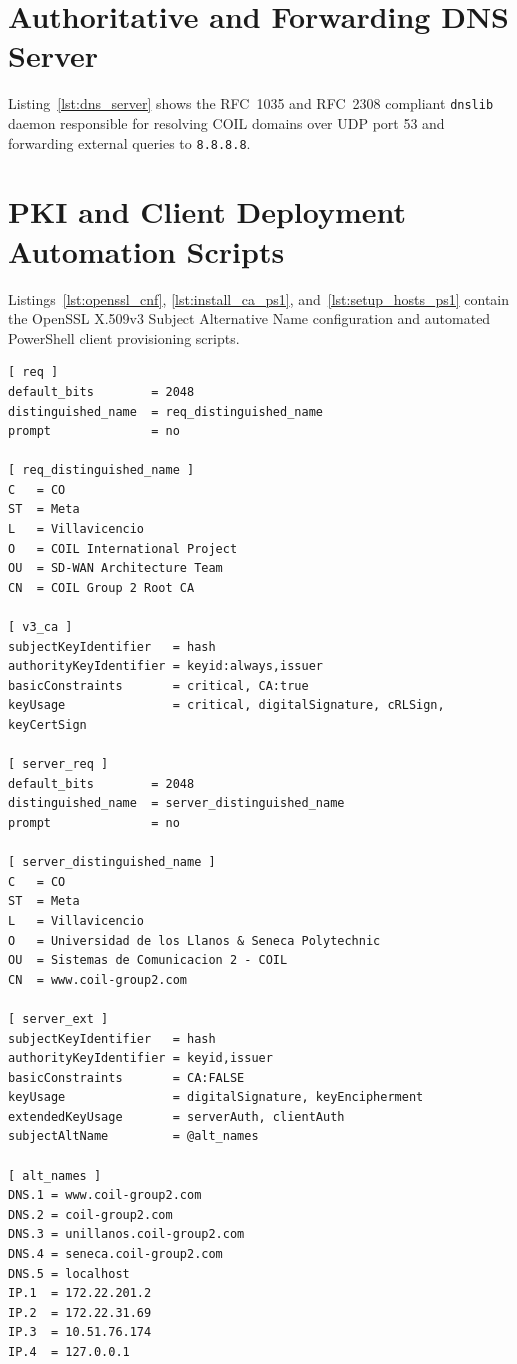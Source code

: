 \section{Authoritative and Forwarding DNS Server}
\label{app:dns_server}
Listing~\ref{lst:dns_server} shows the RFC~1035 and RFC~2308 compliant \texttt{dnslib} daemon responsible for resolving COIL domains over UDP port 53 and forwarding external queries to \texttt{8.8.8.8}.



\section{PKI and Client Deployment Automation Scripts}
\label{app:pki_scripts}
Listings~\ref{lst:openssl_cnf}, \ref{lst:install_ca_ps1}, and~\ref{lst:setup_hosts_ps1} contain the OpenSSL X.509v3 Subject Alternative Name configuration and automated PowerShell client provisioning scripts.

\begin{lstlisting}[caption={OpenSSL PKI and SAN extension policy (\texttt{modulo2/certificados/openssl.cnf}).},label={lst:openssl_cnf}]
[ req ]
default_bits        = 2048
distinguished_name  = req_distinguished_name
prompt              = no

[ req_distinguished_name ]
C   = CO
ST  = Meta
L   = Villavicencio
O   = COIL International Project
OU  = SD-WAN Architecture Team
CN  = COIL Group 2 Root CA

[ v3_ca ]
subjectKeyIdentifier   = hash
authorityKeyIdentifier = keyid:always,issuer
basicConstraints       = critical, CA:true
keyUsage               = critical, digitalSignature, cRLSign, keyCertSign

[ server_req ]
default_bits        = 2048
distinguished_name  = server_distinguished_name
prompt              = no

[ server_distinguished_name ]
C   = CO
ST  = Meta
L   = Villavicencio
O   = Universidad de los Llanos & Seneca Polytechnic
OU  = Sistemas de Comunicacion 2 - COIL
CN  = www.coil-group2.com

[ server_ext ]
subjectKeyIdentifier   = hash
authorityKeyIdentifier = keyid,issuer
basicConstraints       = CA:FALSE
keyUsage               = digitalSignature, keyEncipherment
extendedKeyUsage       = serverAuth, clientAuth
subjectAltName         = @alt_names

[ alt_names ]
DNS.1 = www.coil-group2.com
DNS.2 = coil-group2.com
DNS.3 = unillanos.coil-group2.com
DNS.4 = seneca.coil-group2.com
DNS.5 = localhost
IP.1  = 172.22.201.2
IP.2  = 172.22.31.69
IP.3  = 10.51.76.174
IP.4  = 127.0.0.1
\end{lstlisting}





